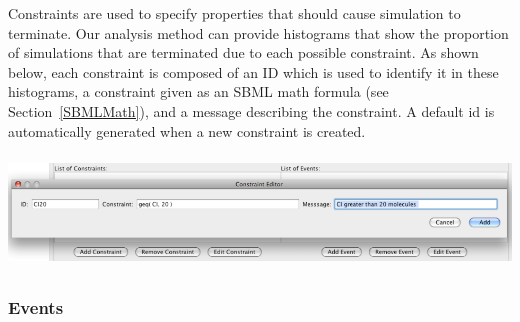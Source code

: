 \documentclass[titlepage,11pt]{article}
\begin{document}
\noindent
Constraints are used to specify properties that should cause
simulation to terminate.  Our analysis method can provide histograms 
that show the proportion of simulations that are terminated due to each
possible constraint.  As shown below, 
each constraint is composed of an ID which is
used to identify it in these histograms, a constraint given as an 
SBML math formula (see Section~\ref{SBMLMath}), and a message 
describing the constraint.  A default id is automatically generated 
when a new constraint is created.
\begin{center}
\includegraphics[height=30mm]{screenshots/constraint}
\end{center}

\clearpage

\subsubsection{\label{events}Events}
\end{document}
